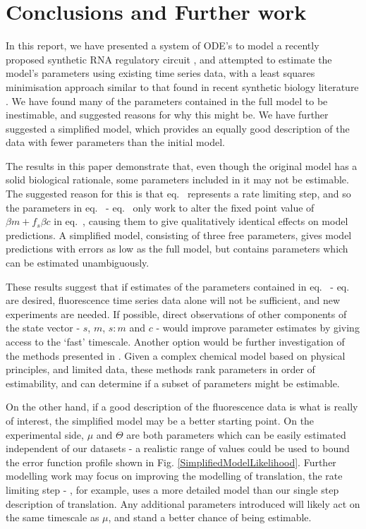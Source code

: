 \documentclass[10pt,journal]{./IEEE_latex_class/IEEEtran}
\renewcommand{\eqref}{eq.~\originaleqref}
\begin{document}
\section{Conclusions and Further work}
\label{Conclusions and Further work}

In this report, we have presented a system of ODE's to model a recently proposed synthetic RNA regulatory circuit \cite{Rodrigo2012}, and attempted to estimate the model's parameters using existing time series data, with a least squares minimisation approach similar to that found in recent synthetic biology literature \cite{Hu2015}. We have found many of the parameters contained in the full model to be inestimable, and suggested reasons for why this might be. We have further suggested a simplified model, which provides an equally good description of the data with fewer parameters than the initial model.

The results in this paper demonstrate that, even though the original model has a solid biological rationale, some parameters included in it may not be estimable. The suggested reason for this is that \eqref{eq:p} represents a rate limiting step, and so the parameters in \eqref{eq:s} - \eqref{eq:c} only work to alter the fixed point value of $\beta m +f_{s}\beta c$ in \eqref{eq:p}, causing them to give qualitatively identical effects on model predictions. A simplified model, consisting of three free parameters, gives model predictions with errors as low as the full model, but contains parameters which can be estimated unambiguously.

These results suggest that if estimates of the parameters contained in \eqref{eq:s} - \eqref{eq:c} are desired, fluorescence time series data alone will not be sufficient, and new experiments are needed. If possible, direct observations of other components of the state vector - $s$, $m$, $s:m$ and $c$ - would improve parameter estimates by giving access to the `fast' timescale. Another option would be further investigation of the methods presented in \cite{Mclean2012,Yao2003,Mclean2012-2}. Given a complex chemical model based on physical principles, and limited data, these methods rank parameters in order of estimability, and can determine if a subset of parameters might be estimable.

On the other hand, if a good description of the fluorescence data is what is really of interest, the simplified model may be a better starting point. On the experimental side, $\mu$ and $\Theta$ are both parameters which can be easily estimated independent of our datasets - a realistic range of values could be used to bound the error function profile shown in Fig. \ref{SimplifiedModelLikelihood}. Further modelling work may focus on improving the modelling of translation, the rate limiting step - \cite{Hu2015}, for example, uses a more detailed model than our single step description of translation. Any additional parameters introduced will likely act on the same timescale as $\mu$, and stand a better chance of being estimable.
\end{document}
